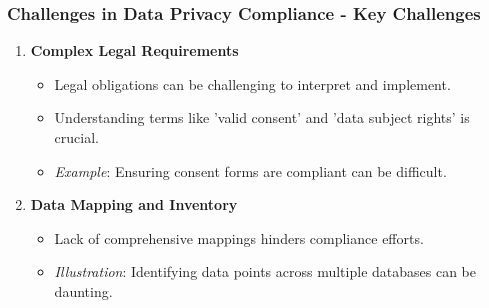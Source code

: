 \documentclass[aspectratio=169]{beamer}
\begin{document}
\begin{frame}[fragile]
    \frametitle{Challenges in Data Privacy Compliance - Key Challenges}
    \begin{enumerate}
        \item \textbf{Complex Legal Requirements}
            \begin{itemize}
                \item Legal obligations can be challenging to interpret and implement.
                \item Understanding terms like 'valid consent' and 'data subject rights' is crucial.
                \item \textit{Example}: Ensuring consent forms are compliant can be difficult.
            \end{itemize}
        \item \textbf{Data Mapping and Inventory}
            \begin{itemize}
                \item Lack of comprehensive mappings hinders compliance efforts.
                \item \textit{Illustration}: Identifying data points across multiple databases can be daunting.
            \end{itemize}
    \end{enumerate}
\end{frame}
\end{document}
